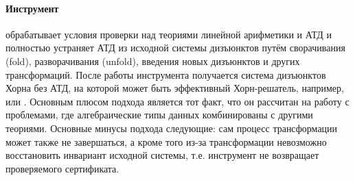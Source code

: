 \paragraph{Инструмент \vericat{}~\cite{10.1093/logcom/exab090,pettorossi_proietti_2022,10.1007/978-3-030-51074-9_6,angelis_fioravanti_pettorossi_proietti_2018}} обрабатывает условия проверки над теориями линейной арифметики и АТД и полностью устраняет АТД из исходной системы дизъюнктов путём сворачивания (fold), разворачивания (unfold), введения новых дизъюнктов и других трансформаций.
После работы инструмента получается система дизъюнктов Хорна без АТД, на которой может быть эффективный Хорн-решатель, например, \spacer{} или \eldarica{}.
Основным плюсом подхода является тот факт, что он рассчитан на работу с проблемами, где алгебраические типы данных комбинированы с другими теориями.
Основные минусы подхода следующие: сам процесс трансформации может также не завершаться, а кроме того из-за трансформации невозможно восстановить инвариант исходной системы, т.е. инструмент не возвращает проверяемого сертификата.



